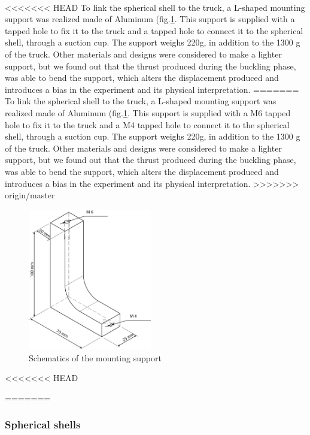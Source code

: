 \paragraph{}
<<<<<<< HEAD
To link the spherical shell to the truck, a L-shaped mounting support was realized made of Aluminum (fig.\ref{fig:mounting_support}. This support is supplied with a tapped hole to fix it to the truck and a tapped hole to connect it to the spherical shell, through a suction cup. The support weighs 220g, in addition to the 1300 g of the truck. Other materials and designs were considered to make a lighter support, but we found out that the thrust produced during the buckling phase, was able to bend the support, which alters the displacement produced and introduces a bias in the experiment and its physical interpretation.
=======
To link the spherical shell to the truck, a L-shaped mounting support was realized made of Aluminum (fig.\ref{fig:mounting_support}. This support is supplied with a M6 tapped hole to fix it to the truck and a M4 tapped hole to connect it to the spherical shell, through a suction cup. The support weighs 220g, in addition to the 1300 g of the truck. Other materials and designs were considered to make a lighter support, but we found out that the thrust produced during the buckling phase, was able to bend the support, which alters the displacement produced and introduces a bias in the experiment and its physical interpretation.
>>>>>>> origin/master
\begin{figure}[H] %
	\centering%
	\includegraphics[width=0.48\textwidth]{figures/Chapter_1/Support.png}
	\caption{Schematics of the mounting support}
	\label{fig:mounting_support}
\end{figure}

<<<<<<< HEAD

=======
\subsubsection{Spherical shells}
